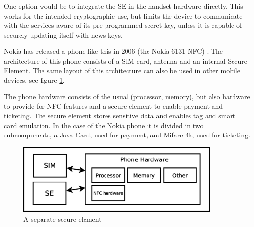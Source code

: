 




One option would be to integrate the SE in the handset hardware directly.
This works for the intended cryptographic use, but limits the device to communicate with the services aware of its pre-programmed secret key, unless it is capable of securely updating itself with news keys.

Nokia has released a phone like this in 2006 (the Nokia 6131 NFC) . %
The architecture of this phone consists of a SIM card, antenna and an internal Secure Element.
The same layout of this architecture can also be used in other mobile devices, see figure \ref{fig:integrated_se}.

The phone hardware consists of the usual (processor, memory), but also hardware to provide for NFC features and a secure element to enable payment and ticketing.
The secure element stores sensitive data and enables tag and smart card emulation.
In the case of the Nokia phone it is divided in two subcomponents, a Java Card, used for payment, and Mifare 4k, used for ticketing.

\begin{figure}
\includegraphics[width=0.9\textwidth]{images/phone_with_SE_nokia}
\caption[Nokia phone with SE]
{
A separate secure element
}
\label{fig:integrated_se}
\end{figure}


